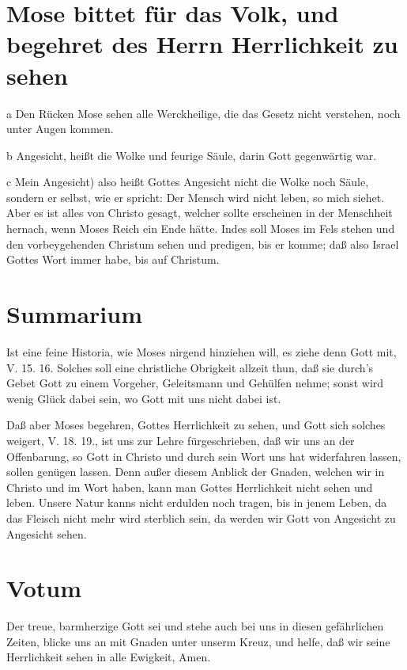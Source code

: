 \section[Mose bittet für das Volk, und begehret des]{Mose bittet für das Volk, und begehret des Herrn Herrlichkeit zu sehen}

a Den Rücken Mose sehen alle Werckheilige, die das Gesetz nicht verstehen, noch unter Augen kommen.

b Angesicht, heißt die Wolke und feurige Säule, darin Gott gegenwärtig war.

c Mein Angesicht) also heißt Gottes Angesicht nicht die Wolke noch Säule, sondern er selbst, wie er spricht: Der Mensch wird nicht leben, so mich siehet. Aber es ist alles von Christo gesagt, welcher sollte erscheinen in der Menschheit hernach, wenn Moses Reich ein Ende hätte. Indes soll Moses im Fels stehen und den vorbeygehenden Christum sehen und predigen, bis er komme; daß also Israel Gottes Wort immer habe, bis auf Christum.

\section{Summarium}

Ist eine feine Historia, wie Moses nirgend hinziehen will, es ziehe denn Gott mit, V. 15. 16. Solches soll eine christliche Obrigkeit allzeit thun, daß sie durch's Gebet Gott zu einem Vorgeher, Geleitsmann und Gehülfen nehme; sonst wird wenig Glück dabei sein, wo Gott mit uns nicht dabei ist.

Daß aber Moses begehren, Gottes Herrlichkeit zu sehen, und Gott sich solches weigert, V. 18. 19., ist uns zur Lehre fürgeschrieben, daß wir uns an der Offenbarung, so Gott in Christo und durch sein Wort uns hat widerfahren lassen, sollen genügen lassen. Denn außer diesem Anblick der Gnaden, welchen wir in Christo und im Wort haben, kann man Gottes Herrlichkeit nicht sehen und leben. Unsere Natur kanns nicht erdulden noch tragen, bis in jenem Leben, da das Fleisch nicht mehr wird sterblich sein, da werden wir Gott von Angesicht zu Angesicht sehen.

\section{Votum}

Der treue, barmherzige Gott sei und stehe auch bei uns in diesen gefährlichen Zeiten, blicke uns an mit Gnaden unter unserm Kreuz, und helfe, daß wir seine Herrlichkeit sehen in alle Ewigkeit, Amen.

